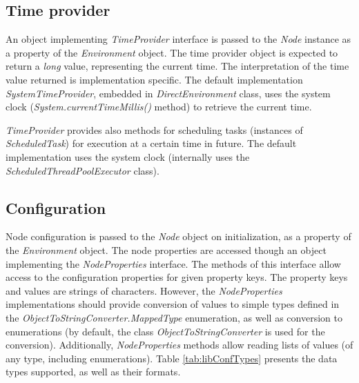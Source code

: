 \subsection{Time provider}
\label{sec:libTimeProvider}

An object implementing \emph{TimeProvider} interface is passed to the \emph{Node} instance as a property of the \emph{Environment} object. The time provider object is expected to return a \emph{long} value, representing the current time. The interpretation of the time value returned is implementation specific. The default implementation \emph{SystemTimeProvider}, embedded in \emph{DirectEnvironment} class, uses the system clock (\emph{System.currentTimeMillis()} method) to retrieve the current time.

\emph{TimeProvider} provides also methods for scheduling tasks (instances of \emph{ScheduledTask}) for execution at a certain time in future. The default implementation uses the system clock (internally uses the \emph{ScheduledThreadPoolExecutor} class).




\subsection{Configuration}
\label{sec:libConfiguration}

Node configuration is passed to the \emph{Node} object on initialization, as a property of the \emph{Environment} object. The node properties are accessed though an object implementing the \emph{NodeProperties} interface. The methods of this interface allow access to the configuration properties for given property keys. The property keys and values are strings of characters. However, the \emph{NodeProperties} implementations should provide conversion of values to simple types defined in the \emph{ObjectToStringConverter.MappedType} enumeration, as well as conversion to enumerations (by default, the class \emph{ObjectToStringConverter} is used for the conversion). Additionally, \emph{NodeProperties} methods allow reading lists of values (of any type, including enumerations). Table \ref{tab:libConfTypes} presents the data types supported, as well as their formats.

